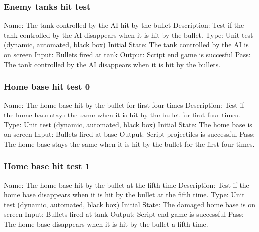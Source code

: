 \documentclass{article}
\begin{document}
\subsubsection{Enemy tanks hit test}
Name:  The tank controlled by the AI hit by the bullet\newline
Description: Test if the tank controlled by the AI disappears when it is hit 
by the bullet. \newline
Type: Unit test (dynamic, automated, black box) \newline
Initial State:  The tank controlled by the AI is on screen \newline
Input: Bullets fired at tank\newline
Output: Script end game is succesful\newline
Pass: The tank controlled by the AI disappears when it is hit by the bullets.
\newline


\subsubsection{Home base hit test 0}
Name:  The home base hit by the bullet for first four times\newline
Description: Test if the home base stays the same when it is hit by the bullet 
for first four times. \newline
Type: Unit test (dynamic, automated, black box) \newline
Initial State:  The home base is on screen \newline
Input: Bullets fired at base\newline
Output: Script projectiles is successful  \newline
Pass:  The home base stays the same when it is hit by the bullet for the first 
four times. \newline


\subsubsection{Home base hit test 1}
Name: The home base hit by the bullet at the fifth time\newline
Description: Test if the home base disappears when it is hit by the bullet  at 
the fifth time. \newline
Type: Unit test (dynamic, automated, black box) \newline
Initial State:  The damaged home base is on screen \newline
Input: Bullets fired at tank\newline
Output: Script end game is successful\newline
Pass: The home base disappears when it is hit by the bullet a fifth 
time. \newline
\end{document}
